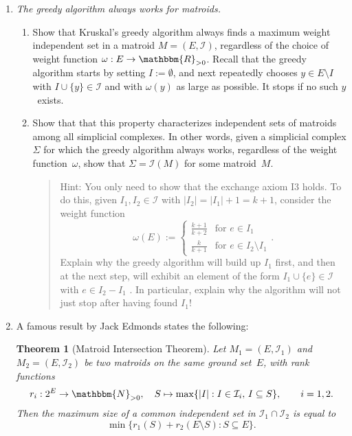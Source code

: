 \documentclass[11pt]{amsart}
\newcommand{\NN}{\mathbbm{N}}
\newcommand{\RR}{\mathbbm{R}}
\newcommand{\cI}{\mathcal{I}}
\newcommand{\defn}[1]{{\color{blue}#1}}
\newtheorem*{thmstar}{Theorem}
\begin{document}
\begin{enumerate}
\bigskip 
  
\item \emph{The greedy algorithm always works for matroids.}
  \begin{enumerate}
  \item
    Show that Kruskal's greedy algorithm always finds a
maximum weight independent set in a matroid $M=(E,\cI)$, regardless of the choice of weight
function $\omega : E\to\RR_{>0}$.
Recall that the \defn{greedy algorithm} starts by setting $I:=\emptyset$,
and next repeatedly chooses $y\in E\setminus I$ with $I\cup\{y\}\in\cI$ and with $\omega(y)$ as large as possible.
It stops if no such $y$~exists.

\item
  Show that that this property characterizes independent sets of matroids
  among all simplicial complexes.
  In other words, given a simplicial complex $\Sigma$ for which the greedy algorithm always works, regardless of the weight function~$\omega$,
  show that $\Sigma = \mathcal I(M)$ for some matroid~$M$.
  \begin{quote}
    \footnotesize\color{green!30!black} 
      Hint: You only need to show that the
      exchange axiom I3 holds. To do this, given $I_1 ,I_2\in\mathcal I$ with $|I_2| = |I_1| + 1 = k + 1$,
      consider the weight function
      \[
        \omega(E) :=
        \begin{cases}
          \frac{k+1}{k+2}
          & \text{for } e\in I_1
          \\
          \frac{k}{k+1}
          & \text{for } e\in I_2\setminus I_1
        \end{cases}.
      \]
      Explain why the greedy algorithm will build up $I_1$ first, and then at the next step,
      will exhibit an element of the form $I_1 \cup \{e\} \in \mathcal I$ with $e \in I_2 - I_1$ . In particular,
      explain why the algorithm will not just stop after having found $I_1$!
    \end{quote}
  \end{enumerate}

  \bigskip

\item
  A famous result by Jack Edmonds states the following:

  \begin{thmstar}[Matroid Intersection Theorem]
    Let $M_1=(E,\cI_1)$ and $M_2=(E,\cI_2)$ be two matroids on the same ground set~$E$, 
    with rank functions
    \[
      r_i:
      2^E\to\NN_{>0},
      \quad
      S\mapsto\max\{|I|:I\in\cI_i,\,I\subseteq S\},
      \qquad
      i=1,2.
    \]
    Then the maximum size of a common independent set in $\cI_1\cap\cI_2$ is equal to
    \[
      \min\{ r_1(S) + r_2(E\setminus S) : S\subseteq E\}.
    \]
  \end{thmstar}


\end{enumerate}
\end{document}
